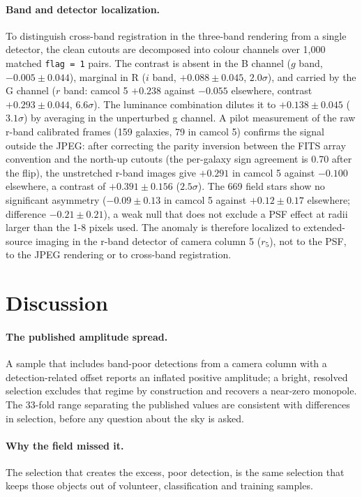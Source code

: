 \documentclass[linenumbers]{aa}
\begin{document}
\paragraph{Band and detector localization.} To distinguish cross-band registration in the three-band
rendering from a single detector, the clean cutouts are decomposed into colour channels over 1,000
matched \texttt{flag = 1} pairs. The contrast is absent in the B channel ($g$ band, $-0.005 \pm 0.044$),
marginal in R ($i$ band, $+0.088 \pm 0.045$, $2.0\sigma$), and carried by the G channel ($r$ band:
camcol 5 $+0.238$ against $-0.055$ elsewhere, contrast $+0.293 \pm 0.044$, $6.6\sigma$). The luminance
combination dilutes it to $+0.138 \pm 0.045$ ($3.1\sigma$) by averaging in the unperturbed g channel.
A pilot measurement of the raw r-band calibrated frames (159 galaxies, 79 in camcol 5) confirms the
signal outside the JPEG: after correcting the parity inversion between the FITS array convention
and the north-up cutouts (the per-galaxy sign agreement is 0.70 after the flip), the unstretched
r-band images give $+0.291$ in camcol 5 against $-0.100$ elsewhere, a contrast of
$+0.391 \pm 0.156$ ($2.5\sigma$). The 669 field stars show no significant asymmetry ($-0.09 \pm 0.13$ in
camcol 5 against $+0.12 \pm 0.17$ elsewhere; difference $-0.21 \pm 0.21$), a weak null that does not
exclude a PSF effect at radii larger than the 1-8 pixels used. The anomaly is therefore
localized to extended-source imaging in the r-band detector of camera column 5 ($r_5$), not to the
PSF, to the JPEG rendering or to cross-band registration.

\section{Discussion}
\paragraph{The published amplitude spread.} A sample that includes band-poor detections from a
camera column with a detection-related offset reports an inflated positive amplitude; a bright,
resolved selection excludes that regime by construction and recovers a near-zero monopole. The 33-fold range separating the published values are consistent with differences in selection,
before any question about the sky is asked.

\paragraph{Why the field missed it.} The selection that creates the excess, poor detection, is the
same selection that keeps those objects out of volunteer, classification and training samples.
\end{document}
